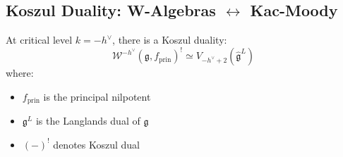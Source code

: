\subsection{Koszul Duality: W-Algebras $\leftrightarrow$ Kac-Moody}
\label{sec:w-algebra-koszul-duality-complete}

\begin{theorem}
\label{thm:w-koszul-duality-critical-complete}
At critical level $k = -h^\vee$, there is a Koszul duality:
\begin{equation}
\mathcal{W}^{-h^\vee}(\mathfrak{g}, f_{\text{prin}})^! \simeq V_{-h^\vee + 2}(
\widehat{\mathfrak{g}}^L)
\end{equation}
where:
\begin{itemize}
\item $f_{\text{prin}}$ is the principal nilpotent
\item $\mathfrak{g}^L$ is the Langlands dual of $\mathfrak{g}$
\item $(-)^!$ denotes Koszul dual
\end{itemize}
\end{theorem}

